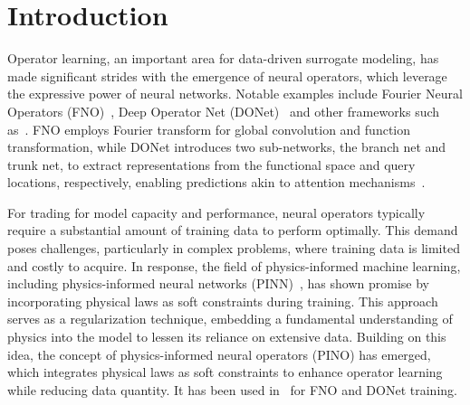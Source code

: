 \section{Introduction}
Operator learning, an important area for data-driven surrogate modeling,  has made significant strides with the emergence of neural operators, which leverage the expressive power of neural networks. 
Notable examples include 
Fourier Neural Operators (FNO)~\citep{li2020fourier}, Deep Operator Net (DONet)~\citep{lu2021learning} and other frameworks such as~\citep{cao2021choose,hao2023gnot}. FNO employs Fourier transform for global convolution and function transformation, while DONet introduces two sub-networks, the branch net and trunk net, to extract representations from the functional space and query locations, respectively, enabling predictions akin to attention mechanisms~\citep{vaswani2017attention}. 

For trading for model capacity and performance, neural operators typically require a substantial amount of training data to perform optimally. This demand poses challenges, particularly in complex problems, where training data is limited and costly to acquire. In response, the field of physics-informed machine learning, including physics-informed neural networks (PINN)~\citep{raissi2019physics}, has shown promise by incorporating physical laws as soft constraints during training. This approach serves as a regularization technique, embedding a fundamental understanding of physics into the model to lessen its reliance on extensive data. Building on this idea, the concept of physics-informed neural operators (PINO) has emerged, which integrates physical laws as soft constraints to enhance operator learning while reducing data quantity. It has been used in~\citep{wang2021learning,li2021physics} for FNO and DONet training.


